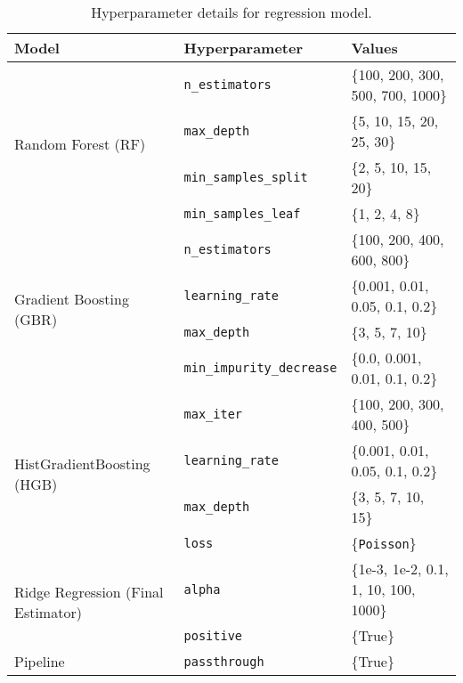 \begin{table*}[ht]
    \centering
    
    \label{tab:hyperparameter-grid}
    \begin{tabular}{lll}
        \hline
        \textbf{Model} & \textbf{Hyperparameter} & \textbf{Values} \\
        \hline
        \multirow{4}{*}{Random Forest (RF)} 
            & \texttt{n\_estimators} & \{100, 200, 300, 500, 700, 1000\} \\
            & \texttt{max\_depth} & \{5, 10, 15, 20, 25, 30\} \\
            & \texttt{min\_samples\_split} & \{2, 5, 10, 15, 20\} \\
            & \texttt{min\_samples\_leaf} & \{1, 2, 4, 8\} \\
        \hline
        \multirow{4}{*}{Gradient Boosting (GBR)} 
            & \texttt{n\_estimators} & \{100, 200, 400, 600, 800\} \\
            & \texttt{learning\_rate} & \{0.001, 0.01, 0.05, 0.1, 0.2\} \\
            & \texttt{max\_depth} & \{3, 5, 7, 10\} \\
            & \texttt{min\_impurity\_decrease} & \{0.0, 0.001, 0.01, 0.1, 0.2\} \\
        \hline
        \multirow{4}{*}{HistGradientBoosting (HGB)} 
            & \texttt{max\_iter} & \{100, 200, 300, 400, 500\} \\
            & \texttt{learning\_rate} & \{0.001, 0.01, 0.05, 0.1, 0.2\} \\
            & \texttt{max\_depth} & \{3, 5, 7, 10, 15\} \\
            & \texttt{loss} & \{\texttt{Poisson}\} \\
        \hline
        \multirow{2}{*}{Ridge Regression (Final Estimator)}
            & \texttt{alpha} & \{1e-3, 1e-2, 0.1, 1, 10, 100, 1000\} \\
            & \texttt{positive} & \{True\} \\
        \hline
        \multirow{1}{*}{Pipeline}
            & \texttt{passthrough} & \{True\} \\
        \hline
    \end{tabular}
    \caption{Hyperparameter details for regression model.}
    \label{tab:hyperparameters}
\end{table*}
